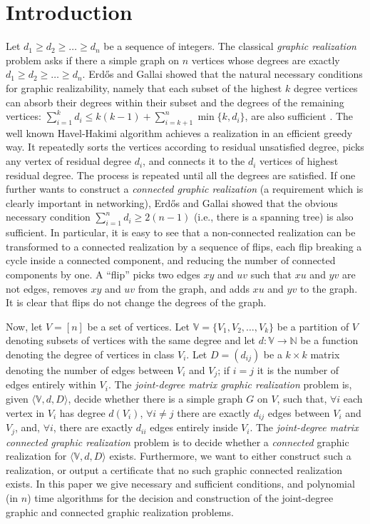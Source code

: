 \documentclass[12pt,a4paper]{article}
\theoremstyle{definition}
\theoremstyle{plain}
\begin{document}
\section{Introduction}
\label{sec:introduction}

Let $d_1 \geq d_2 \geq \ldots \geq d_n$ be a sequence of integers.
The classical {\it graphic realization} problem asks
if there a simple graph on $n$ vertices
whose degrees are exactly $d_1 \geq d_2 \geq \ldots \geq d_n$.
Erd\H{o}s and Gallai
showed that the natural necessary conditions for graphic realizability,
namely that each subset of the highest $k$ degree vertices can absorb
their degrees within their subset and the degrees of the remaining vertices:
$\sum_{i=1}^k d_i \leq k(k\! - \! 1) + \sum_{i=k+1}^n \min \{ k,d_i \} $,
are also sufficient \cite{ErdosGallai,bergebook}.
The well known Havel-Hakimi
algorithm \cite{HavelHakimi1,HavelHakimi2} achieves
a realization
in an efficient greedy way. It repeatedly sorts the vertices according
to residual unsatisfied degree, picks any vertex
of residual degree $d_i$,
and connects it to the $d_i$ vertices of highest residual degree.
The process is repeated until all the degrees are satisfied.
If one further wants to construct a {\it connected graphic realization}
(a requirement which is clearly important in networking),
Erd\H{o}s and Gallai showed that
the obvious necessary condition $\sum_{i=1}^n d_i \geq 2(n\! - \! 1)$
(i.e., there is a spanning tree) is also sufficient.
In particular, it is easy to see that a non-connected realization
can be transformed to a connected
realization by a sequence of flips, each flip breaking a cycle inside
a connected component, and reducing the number of
connected components by one.
A  ``flip''
picks two edges  $xy$ and $uv$
such that $xu$ and $yv$ are not edges,
removes $xy$ and $uv$ from the graph,
and adds $xu$ and $yv$ to the graph.
It is clear that flips do
not change the degrees of the graph.

Now, let $V \! = \! [n]$ be a set of vertices.
Let ${\mathbb V} \! = \! \{ V_1 , V_2 , \ldots , V_k \}$
be a partition of $V$ denoting
subsets of vertices with the same degree and let $d:\mathbb V \rightarrow {\mathbb N}$
be a function denoting the degree
of vertices in class $V_i$.
Let $D \! = \! (d_{ij})$ be a $k\times k$ matrix
denoting the number of edges between $V_i$ and $V_j$;
if $i\! = \! j$ it is the number of edges entirely within $V_i$.
The {\it joint-degree matrix graphic realization} problem is,
given $\langle{\mathbb V},d,D\rangle$, decide
whether there is a simple graph $G$ on $V$, such that,
$\forall i$ each vertex in $V_i$ has degree $d(V_i)$, 
$\forall i \neq j$ there are exactly $d_{ij}$ edges between $V_i$ and $V_j$,
and, $\forall i$, there are exactly $d_{ii}$ edges entirely inside $V_i$.
The {\it joint-degree matrix connected graphic realization} problem
is to decide whether a \emph{connected} graphic realization for 
$\langle{\mathbb V},d,D\rangle$
exists. Furthermore, we want to either construct such a realization,
or output a certificate that no such graphic connected realization 
exists.
In this paper we give necessary and sufficient conditions, and polynomial (in $n$) time algorithms
for the decision and construction of the joint-degree graphic
and connected graphic realization problems.
\end{document}
